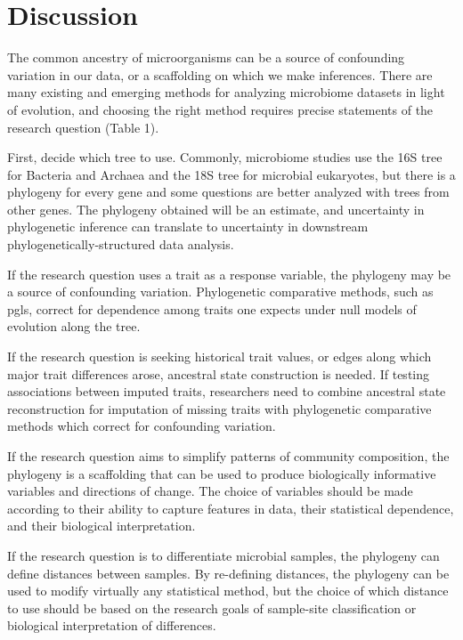 \section{Discussion}
The common ancestry of microorganisms can be a source of confounding variation in our data, or a scaffolding on which we make inferences. There are many existing and emerging methods for analyzing microbiome datasets in light of evolution, and choosing the right method requires precise statements of the research question (Table 1).\par
First, decide which tree to use. Commonly, microbiome studies use the 16S tree for Bacteria and Archaea and the 18S tree for microbial eukaryotes, but there is a phylogeny for every gene and some questions are better analyzed with trees from other genes. The phylogeny obtained will be an estimate, and uncertainty in phylogenetic inference can translate to uncertainty in downstream phylogenetically-structured data analysis.\par
If the research question uses a trait as a response variable, the phylogeny may be a source of confounding variation. Phylogenetic comparative methods, such as \gls{pgls}, correct for dependence among traits one expects under null models of evolution along the tree.\par
If the research question is seeking historical trait values, or edges along which major trait differences arose, ancestral state construction is needed. If testing associations between imputed traits, researchers need to combine ancestral state reconstruction for imputation of missing traits with phylogenetic comparative methods which correct for confounding variation. \par
If the research question aims to simplify patterns of community composition, the phylogeny is a scaffolding that can be used to produce biologically informative variables and directions of change. The choice of variables should be made according to their ability to capture features in data, their statistical dependence, and their biological interpretation.\par
If the research question is to differentiate microbial samples, the phylogeny can define distances between samples. By re-defining distances, the phylogeny can be used to modify virtually any statistical method, but the choice of which distance to use should be based on the research goals of sample-site classification or biological interpretation of differences.\par

